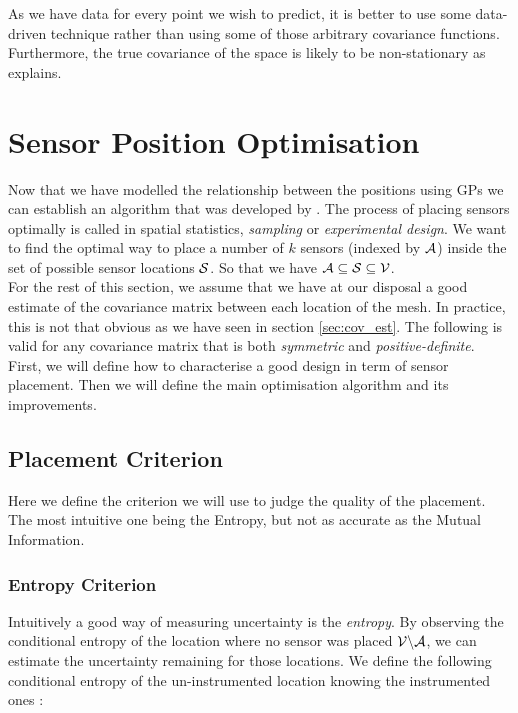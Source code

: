 As we have data for every point we wish to predict, it is better to use some data-driven technique rather than using some of those arbitrary covariance functions. Furthermore, the true covariance of the space is likely to be non-stationary as \citet{krause_near-optimal_2008} explains. 


\section{Sensor Position Optimisation}\label{sec:theory:opt}

Now that we have modelled the relationship between the positions using GPs we can establish an algorithm that was developed by \citet{krause_near-optimal_2008}. The process of placing sensors optimally is called in spatial statistics, \textit{sampling} or \textit{experimental design}. We want to find the optimal way to place a number of $k$ sensors (indexed by $\A$) inside the set of possible sensor locations $ \S$. So that we have $\A \subseteq \S \subseteq \V$. \\


For the rest of this section, we assume that we have at our disposal a good estimate of the covariance matrix between each location of the mesh. In practice, this is not that obvious as we have seen in section \ref{sec:cov_est}. The following is valid for any covariance matrix that is both \textit{symmetric} and \textit{positive-definite}. \\ 

First, we will define how to characterise a good design in term of sensor placement. Then we will define the main optimisation algorithm and its improvements. \\ 

\subsection{Placement Criterion}

Here we define the criterion we will use to judge the quality of the placement. The most intuitive one being the Entropy, but not as accurate as the Mutual Information. 

\subsubsection{Entropy Criterion}

Intuitively a good way of measuring uncertainty is the \textit{entropy}. By observing the conditional entropy of the location where no sensor was placed $\VA$, we can estimate the uncertainty remaining for those locations. We define the following conditional entropy of the un-instrumented location knowing the instrumented ones \citep[p.~16]{cover_elements_1991}:

